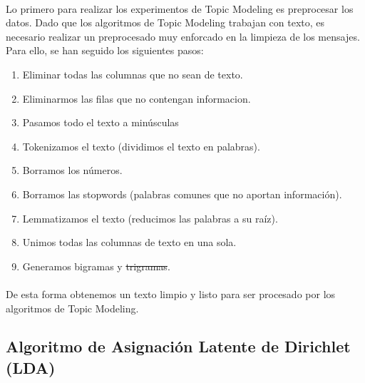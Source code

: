 \documentclass{report}
\begin{document}
{{                \paragraph*{}{
                    Lo primero para realizar los experimentos de Topic Modeling es preprocesar los datos.
                    Dado que los algoritmos de Topic Modeling trabajan con texto, es necesario realizar un preprocesado muy enforcado en la limpieza de los mensajes.
                    Para ello, se han seguido los siguientes pasos:
                }
                \begin{enumerate}
                    \item Eliminar todas las columnas que no sean de texto.
                    \item Eliminarmos las filas que no contengan informacion.
                    \item Pasamos todo el texto a minúsculas
                    \item Tokenizamos el texto (dividimos el texto en palabras).
                    \item Borramos los números.
                    \item Borramos las stopwords (palabras comunes que no aportan información).
                    \item Lemmatizamos el texto (reducimos las palabras a su raíz).
                    \item Unimos todas las columnas de texto en una sola.
                    \item Generamos bigramas y \st{trigramas}.
                \end{enumerate}
                \paragraph*{}{
                    De esta forma obtenemos un texto limpio y listo para ser procesado por los algoritmos de Topic Modeling.
                }
            \subsection{Algoritmo de Asignación Latente de Dirichlet (LDA)}
}}
\end{document}
